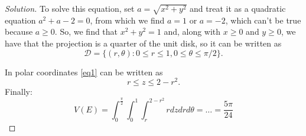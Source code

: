 \documentclass[12pt]{article}
\renewcommand{\D}{\mathcal{D}}
\newenvironment{solution}
  {\begin{proof}[Solution]}
  {\end{proof}
  
  }
\begin{document}
\begin{solution}
To solve this equation, set $a=\sqrt{x^2+y^2}$ and treat it as a quadratic equation $a^2+a-2=0$, from which we find $a=1$ or $a=-2$, which can't be true because $a\geq 0$. So, we find that $x^2+y^2=1$ and, along with $x\geq 0$ and $y\geq 0$, we have that the projection is a quarter of the unit disk, so it can be written as $$\D=\{(r,\theta): 0\leq r\leq 1, 0\leq \theta\leq \pi/2\}.$$ 

In polar coordinates \ref{eq1} can be written as $$r\leq z\leq 2-r^2.$$ Finally: $$V(E)=\int_0^{\frac{\pi}{2}}\int_{0}^{1}\int_r^{2-r^2}rdzdrd\theta=\dots=\frac{5\pi}{24}$$


\end{solution}
\end{document}
